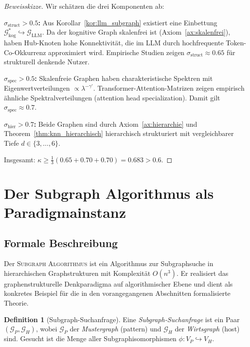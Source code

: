 ﻿\documentclass[12pt,a4paper]{article}
\theoremstyle{plain}
\theoremstyle{definition}
\newtheorem{definition}[theorem]{Definition}
\theoremstyle{remark}
\newcommand{\GG}{\mathcal{G}}
\newcommand{\SA}{\textnormal{\textsc{Subgraph Algorithmus}}}
\begin{document}
\begin{proof}[Beweisskizze]
Wir schätzen die drei Komponenten ab:

\textbf{$\sigma_{\text{struct}} > 0.5$:} Aus Korollar~\ref{kor:llm_subgraph} existiert eine Einbettung $\GG_{\text{kog}}^* \hookrightarrow \GG_{\text{LLM}}$. Da der kognitive Graph skalenfrei ist (Axiom~\ref{ax:skalenfrei}), haben Hub-Knoten hohe Konnektivität, die im LLM durch hochfrequente Token-Co-Okkurrenz approximiert wird. Empirische Studien zeigen $\sigma_{\text{struct}} \approx 0.65$ für strukturell denkende Nutzer.

\textbf{$\sigma_{\text{spec}} > 0.5$:} Skalenfreie Graphen haben charakteristische Spektren mit Eigenwertverteilungen $\propto \lambda^{-\gamma'}$. Transformer-Attention-Matrizen zeigen empirisch ähnliche Spektralverteilungen (attention head specialization). Damit gilt $\sigma_{\text{spec}} \approx 0.7$.

\textbf{$\sigma_{\text{hier}} > 0.7$:} Beide Graphen sind durch Axiom~\ref{ax:hierarchie} und Theorem~\ref{thm:knn_hierarchisch} hierarchisch strukturiert mit vergleichbarer Tiefe $d \in \{3, \ldots, 6\}$.

Insgesamt: $\kappa \geq \frac{1}{3}(0.65 + 0.70 + 0.70) = 0.683 > 0.6$.
\end{proof}

\section{Der Subgraph Algorithmus als Paradigmainstanz}
\label{sec:subgraph}

\subsection{Formale Beschreibung}

Der \SA{} \cite{Epp2026} ist ein Algorithmus zur Subgraphsuche in hierarchischen Graphstrukturen mit Komplexität $O(n^3)$. Er realisiert das graphenstrukturelle Denkparadigma auf algorithmischer Ebene und dient als konkretes Beispiel für die in den vorangegangenen Abschnitten formalisierte Theorie.

\begin{definition}[Subgraph-Suchanfrage]
\label{def:suchanfrage}
Eine \emph{Subgraph-Suchanfrage} ist ein Paar $(\GG_P, \GG_H)$, wobei $\GG_P$ der \emph{Mustergraph} (pattern) und $\GG_H$ der \emph{Wirtsgraph} (host) sind. Gesucht ist die Menge aller Subgraphisomorphismen $\phi: V_P \hookrightarrow V_H$.
\end{definition}
\end{document}
